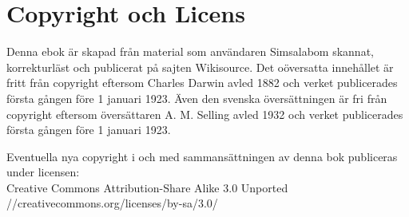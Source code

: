 \documentclass[a5paper]{book}
\begin{document}

\tableofcontents
















\appendix
\chapter{Copyright och Licens}
Denna ebok är skapad från material som användaren Simsalabom skannat, korrekturläst och publicerat på sajten 
Wikisource. Det oöversatta innehållet är fritt från copyright eftersom Charles Darwin avled 1882 och verket publicerades första gången före 1 januari 1923. Även den svenska översättningen är fri från copyright eftersom översättaren A. M. Selling avled 1932 och verket publicerades första gången före 1 januari 1923.

Eventuella nya copyright i och med sammansättningen av denna bok publiceras under licensen: \\[0.5cm]
Creative Commons Attribution-Share Alike 3.0 Unported \\
//creativecommons.org/licenses/by-sa/3.0/
\end{document}
